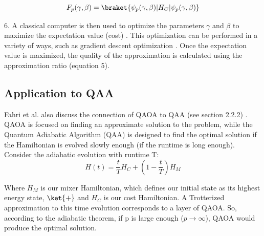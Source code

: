 \begin{equation} 
    F_p(\gamma, \beta) = \braket{\psi_p(\gamma, \beta)|H_C|\psi_p(\gamma, \beta)}
\end{equation}

6. A classical computer is then used to optimize the parameters $\gamma$ and $\beta$ to maximize the expectation value (cost) \cite{qaoaNearTerm}. This optimization can be performed in a variety of ways, such as gradient descent optimization \cite{qaoaNearTerm}. Once the expectation value is maximized, the quality of the approximation is calculated using the approximation ratio (equation 5).

\subsection{Application to QAA}
Fahri et al. also discuss the connection of QAOA to QAA (see section 2.2.2) \cite{farhiQAOA}. QAOA is focused on finding an approximate solution to the problem, while the Quantum Adiabatic Algorithm (QAA) is designed to find the optimal solution if the Hamiltonian is evolved slowly enough (if the runtime is long enough). Consider the adiabatic evolution with runtime T: 
\begin{equation} 
    H(t) = \frac{t}{T}H_C + (1- \frac{t}{T})H_M
\end{equation}

Where $H_M$ is our mixer Hamiltonian, which defines our initial state as its highest energy state, $\ket{+}$ and $H_C$ is our cost Hamiltonian. A Trotterized approximation to this time evolution corresponds to a layer of QAOA. So, according to the adiabatic theorem, if p is large enough ($p \rightarrow \infty$), QAOA would produce the optimal solution. 